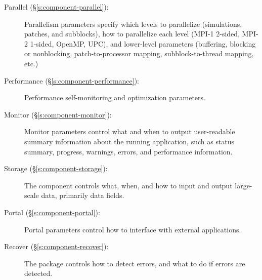 \begin{description}
 \item [Parallel (\S\ref{s:component-parallel}): ] Parallelism parameters
 specify which levels to parallelize (simulations, patches, and
 subblocks), how to parallelize each level (MPI-1 2-sided, MPI-2
 1-sided, OpenMP, UPC), and lower-level parameters (buffering,
 blocking or nonblocking, patch-to-processor mapping,
 subblock-to-thread mapping, etc.)

 \item [Performance (\S\ref{s:component-performance}): ] Performance
 self-monitoring and optimization parameters.

 \item [Monitor (\S\ref{s:component-monitor}): ] Monitor parameters control what
 and when to output user-readable summary information about the
 running application, such as status summary, progress, warnings,
 errors, and performance information.

 \item [Storage (\S\ref{s:component-storage}): ] The 
 component controls what, when, and how to input and output
 large-scale data, primarily data fields.

 \item [Portal (\S\ref{s:component-portal}): ] Portal parameters control
  how to interface with external applications.

 \item [Recover (\S\ref{s:component-recover}): ] The 
 package controls how to detect errors, and what to do if errors are
 detected.

\end{description}























